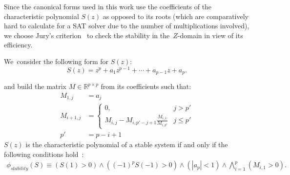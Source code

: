 \documentclass[sigconf]{llncs}
\newcommand{\mat}[1]{{#1}}
\begin{document}
Since the canonical forms used in this work use the coefficients of the
characteristic polynomial $S(z)$ as opposed to its roots (which are
comparatively hard to calculate for a SAT solver due to the number of
multiplications involved), we choose Jury's criterion~\cite{astrom1997computer}
to check the stability in the~$Z$-domain in view of its efficiency.

We~consider the following form for $S(z)$:
%
\begin{equation*}
S(z) = z^{p}+a_1z^{p-1}+\cdots+a_{p-1}z+a_p.
\end{equation*}

and build the matrix
$\mat{M} \in \mathbb{R}^{p \times p}$ from its coefficients such that:
%
\begin{align*}
\mat{M}_{1,j}&=a_j\\
\mat{M}_{i+1,j}&=\left\{
\begin{array}{ll}
0,&j>p'\\
\mat{M}_{i,j}-\mat{M}_{i,p'-j+1}\frac{\mat{M}_{i,1}}{\mat{M}_{i,p'}} &j\leq p'
\end{array}
\right.\\
p'&=p-i+1
\end{align*}
%
$S(z)$ is the characteristic polynomial of a stable system if and
only if the following conditions hold~\cite{astrom1997computer}:
\begin{align*}
\phi_\mathit{stability}(S) \equiv
(S(1) > 0) \wedge ((-1)^p S(-1) > 0) \wedge (|a_p| < 1) \wedge \bigwedge\limits_{i=1}^p (\mat{M}_{i,1} > 0).
\end{align*}
\end{document}
